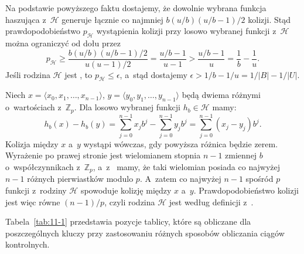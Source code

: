 Na podstawie powyższego faktu dostajemy, że dowolnie wybrana funkcja haszująca z~$\mathcal{H}$ generuje łącznie co najmniej $b(u/b)(u/b-1)/2$ kolizji. Stąd prawdopodobieństwo $p_{\mathcal{H}}$ wystąpienia kolizji przy losowo wybranej funkcji z~$\mathcal{H}$ można ograniczyć od dołu przez
\[
	p_{\mathcal{H}} \ge \frac{b(u/b)(u/b-1)/2}{u(u-1)/2} = \frac{u/b-1}{u-1} > \frac{u/b-1}{u} = \frac{1}{b}-\frac{1}{u}.
\]
Jeśli rodzina $\mathcal{H}$ jest , to $p_{\mathcal{H}}\le\epsilon$, a~stąd dostajemy $\epsilon>1/b-1/u=1/|B|-1/|U|$.

\exercise %
Niech $x=\langle x_0,x_1,\dots,x_{n-1}\rangle$, $y=\langle y_0,y_1,\dots,y_{n-1}\rangle$ będą dwiema różnymi  o~wartościach z~$\mathbb{Z}_p$. Dla losowo wybranej funkcji $h_b\in\mathcal{H}$ mamy:
\[
	h_b(x)-h_b(y) = \sum_{j=0}^{n-1}x_jb^j-\sum_{j=0}^{n-1}y_jb^j = \sum_{j=0}^{n-1}(x_j-y_j)b^j.
\]
Kolizja między $x$ a~$y$ wystąpi wówczas, gdy powyższa różnica będzie zerem. Wyrażenie po prawej stronie jest wielomianem stopnia $n-1$ zmiennej $b$ o~współczynnikach z~$\mathbb{Z}_p$, a~z~ mamy, że taki wielomian posiada co najwyżej $n-1$ różnych pierwiastków modulo $p$. A~zatem co najwyżej $n-1$ spośród $p$ funkcji z~rodziny $\mathcal{H}$ spowoduje kolizję między $x$ a~$y$. Prawdopodobieństwo kolizji jest więc równe $(n-1)/p$, czyli rodzina $\mathcal{H}$ jest  według definicji z~.


\exercise %

\noindent Tabela~\ref{tab:11-1} przedstawia pozycje tablicy, które są obliczane dla poszczególnych kluczy przy zastosowaniu różnych sposobów obliczania ciągów kontrolnych.

